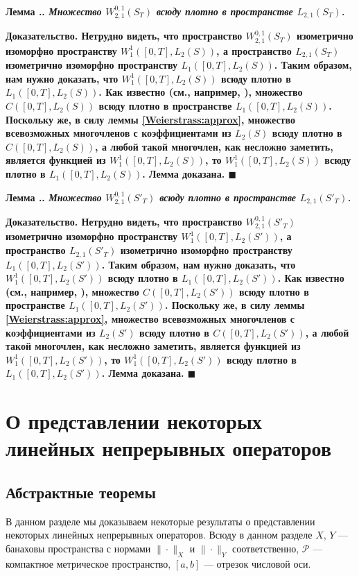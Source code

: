 \documentclass{report}
\newcounter{lem}[section]
\renewcommand{\thelem}{\thesection.\arabic{lem}}
\newenvironment{Lemma}{\par\refstepcounter{lem}\bf Лемма \thelem. \it}{\rm\par}
\newenvironment{Proof}{\par\noindent\bf Доказательство.\rm}{ $\blacksquare$\par}
\begin{document}
\begin{Lemma}\label{W01_21(S_T)_is_dense_in_L_21(S_T)}
Множество $W^{0,1}_{2,1}(S_T)$ всюду плотно в пространстве $L_{2,1}(S_T)$.
\end{Lemma}
\begin{Proof}
Нетрудно видеть, что пространство $W^{0,1}_{2,1}(S_T)$ изометрично изоморфно пространству $W^1_1([0,T],L_2(S))$, а пространство $L_{2,1}(S_T)$ изометрично изоморфно пространству
$L_1([0,T],L_2(S))$. Таким образом, нам нужно доказать, что $W^1_1([0,T],L_2(S))$ всюду плотно в $L_1([0,T],L_2(S))$. Как известно (см., например, \cite{warga}), множество
$C([0,T],L_2(S))$ всюду плотно в пространстве $L_1([0,T],L_2(S))$. Поскольку же, в силу леммы \ref{Weierstrass:approx}, множество всевозможных многочленов с коэффициентами из $L_2(S)$
всюду плотно в $C([0,T],L_2(S))$, а любой такой многочлен, как несложно заметить, является функцией из $W^1_1([0,T],L_2(S))$, то $W^1_1([0,T],L_2(S))$ всюду плотно в $L_1([0,T],L_2(S))$.
Лемма доказана.
\end{Proof}

\begin{Lemma}\label{W01_21(S'_T)_is_dense_in_L_21(S'_T)}
Множество $W^{0,1}_{2,1}(S'_T)$ всюду плотно в пространстве $L_{2,1}(S'_T)$.
\end{Lemma}
\begin{Proof}
Нетрудно видеть, что пространство $W^{0,1}_{2,1}(S'_T)$ изометрично изоморфно пространству $W^1_1([0,T],L_2(S'))$, а пространство $L_{2,1}(S'_T)$ изометрично изоморфно пространству
$L_1([0,T],L_2(S'))$. Таким образом, нам нужно доказать, что $W^1_1([0,T],L_2(S'))$ всюду плотно в $L_1([0,T],L_2(S'))$. Как известно (см., например, \cite{warga}), множество
$C([0,T],L_2(S'))$ всюду плотно в пространстве $L_1([0,T],L_2(S'))$. Поскольку же, в силу леммы \ref{Weierstrass:approx}, множество всевозможных многочленов с коэффициентами из $L_2(S')$
всюду плотно в $C([0,T],L_2(S'))$, а любой такой многочлен, как несложно заметить, является функцией из $W^1_1([0,T],L_2(S'))$, то $W^1_1([0,T],L_2(S'))$ всюду плотно в
$L_1([0,T],L_2(S'))$. Лемма доказана.
\end{Proof}

    \chapter{О представлении некоторых линейных непрерывных операторов}
        \section{Абстрактные теоремы}
В данном разделе мы доказываем некоторые результаты о представлении некоторых линейных непрерывных операторов. Всюду в данном разделе $X$, $Y$ --- банаховы пространства с нормами $\|\cdot\|_X$ и $\|\cdot\|_Y$ соответственно, $\mathcal{P}$ --- компактное метрическое пространство, $[a,b]$ --- отрезок числовой оси.
\end{document}
